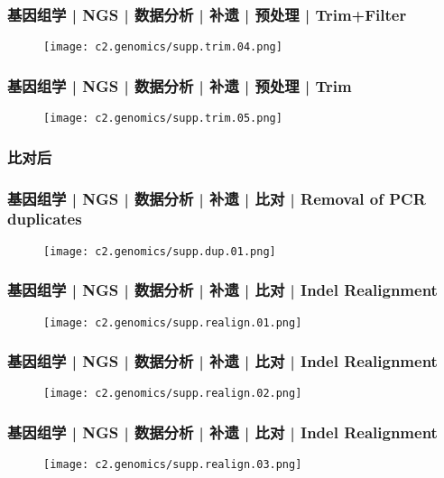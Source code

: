 \begin{frame}
  \frametitle{基因组学 | NGS | 数据分析 | 补遗 | 预处理 | Trim+Filter}
  \begin{figure}
    \centering
    \texttt{[image: c2.genomics/supp.trim.04.png]}
  \end{figure}
\end{frame}

\begin{frame}
  \frametitle{基因组学 | NGS | 数据分析 | 补遗 | 预处理 | Trim}
  \begin{figure}
    \centering
    \texttt{[image: c2.genomics/supp.trim.05.png]}
  \end{figure}
\end{frame}

\subsubsection{比对后}
\begin{frame}
  \frametitle{基因组学 | NGS | 数据分析 | 补遗 | 比对 | Removal of PCR duplicates}
  \begin{figure}
    \centering
    \texttt{[image: c2.genomics/supp.dup.01.png]}
  \end{figure}
\end{frame}

\begin{frame}
  \frametitle{基因组学 | NGS | 数据分析 | 补遗 | 比对 | Indel Realignment}
  \begin{figure}
    \centering
    \texttt{[image: c2.genomics/supp.realign.01.png]}
  \end{figure}
\end{frame}

\begin{frame}
  \frametitle{基因组学 | NGS | 数据分析 | 补遗 | 比对 | Indel Realignment}
  \begin{figure}
    \centering
    \texttt{[image: c2.genomics/supp.realign.02.png]}
  \end{figure}
\end{frame}

\begin{frame}
  \frametitle{基因组学 | NGS | 数据分析 | 补遗 | 比对 | Indel Realignment}
  \begin{figure}
    \centering
    \texttt{[image: c2.genomics/supp.realign.03.png]}
  \end{figure}
\end{frame}

